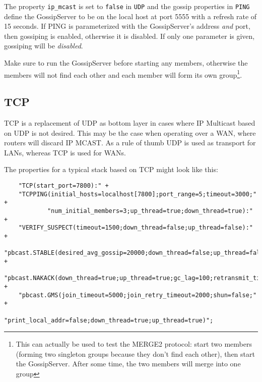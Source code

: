       The property {\tt ip\_mcast} is set to {\tt false} in {\tt UDP} and the gossip
      properties in {\tt PING} define the GossipServer to be on the local host at
      port 5555 with a refresh rate of 15 seconds. If PING is parameterized with the
      GossipServer's address {\em and} port, then gossiping is enabled, otherwise it
      is disabled. If only one parameter is given, gossiping will be {\em disabled}.

      Make sure to run the GossipServer before starting any members, otherwise the
      members will not find each other and each member will form its own
      group\footnote{This can actually be used to test the MERGE2 protocol: start two
      members (forming two singleton groups because they don't find each other), then
      start the GossipServer. After some time, the two members will merge into one
      group}.
       






    \subsection{TCP}

    TCP is a replacement of UDP as bottom layer in cases where IP Multicast based on
    UDP is not desired. This may be the case when operating over a WAN, where routers
    will discard IP MCAST. As a rule of thumb UDP is used as transport for LANs,
    whereas TCP is used for WANs.

    The properties for a typical stack based on TCP might look like this:

    \begin{small}
    \begin{verbatim}
    "TCP(start_port=7800):" +
    "TCPPING(initial_hosts=localhost[7800];port_range=5;timeout=3000;" +
            "num_initial_members=3;up_thread=true;down_thread=true):" +
    "VERIFY_SUSPECT(timeout=1500;down_thread=false;up_thread=false):" +
    "pbcast.STABLE(desired_avg_gossip=20000;down_thread=false;up_thread=false):" +
    "pbcast.NAKACK(down_thread=true;up_thread=true;gc_lag=100;retransmit_timeout=3000):" +
    "pbcast.GMS(join_timeout=5000;join_retry_timeout=2000;shun=false;" +
               "print_local_addr=false;down_thread=true;up_thread=true)";
    \end{verbatim}
    \end{small}


